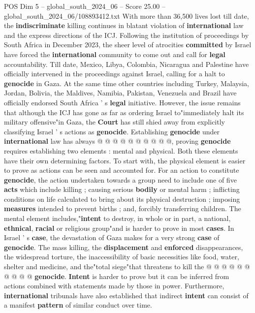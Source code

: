 \begin{textsample}{POS Dim 5 – global\_south\_2024\_06 – Score 25.00 – global\_south\_2024\_06/108893412.txt}
With more than 36,500 lives lost till date, the \textbf{indiscriminate} killing continues in blatant violation of \textbf{international} law and the express directions of the ICJ.
Following the institution of proceedings by South Africa in December 2023, the sheer level of atrocities \textbf{committed} by Israel have forced the \textbf{international} community to come out and call for \textbf{legal} accountability.
Till date, Mexico, Libya, Colombia, Nicaragua and Palestine have officially intervened in the proceedings against Israel, calling for a halt to \textbf{genocide} in Gaza.
At the same time other countries including Turkey, Malaysia, Jordan, Bolivia, the Maldives, Namibia, Pakistan, Venezuela and Brazil have officially endorsed South Africa ' s \textbf{legal} initiative.
However, the issue remains that although the ICJ has gone as far as ordering Israel to"immediately halt its military offensive"in Gaza, the \textbf{Court} has still shied away from explicitly classifying Israel ' s actions as \textbf{genocide}.
Establishing \textbf{genocide} under \textbf{international} law has always @ @ @ @ @ @ @ @ @ @, proving \textbf{genocide} requires establishing two elements : mental and physical.
Both these elements have their own determining factors.
To start with, the physical element is easier to prove as actions can be seen and accounted for.
For an action to constitute \textbf{genocide}, the action undertaken towards a group need to include one of five \textbf{acts} which include killing ; causing serious \textbf{bodily} or mental harm ; inflicting conditions on life calculated to bring about its physical destruction ; imposing \textbf{measures} intended to prevent births ; and, forcibly transferring children.
The mental element includes,"\textbf{intent} to destroy, in whole or in part, a national, \textbf{ethnical}, \textbf{racial} or religious group"and is harder to prove in most \textbf{cases}.
In Israel ' s \textbf{case}, the devastation of Gaza makes for a very strong \textbf{case} of \textbf{genocide}.
The mass killing, the \textbf{displacement} and \textbf{enforced} disappearances, the widespread torture, the inaccessibility of basic necessities like food, water, shelter and medicine, and the"total siege"that threatens to kill the @ @ @ @ @ @ @ @ @ @ \textbf{genocide}. \textbf{Intent} is harder to prove but it can be inferred from actions combined with statements made by those in power.
Furthermore, \textbf{international} tribunals have also established that indirect \textbf{intent} can consist of a manifest \textbf{pattern} of similar conduct over time.

\end{textsample}

